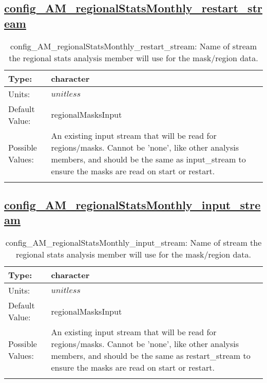 \subsection[config\_AM\_regionalStatsMonthly\_restart\_stream]{\hyperref[sec:nm_tab_AM_regionalStatsMonthly]{config\_AM\_regionalStatsMonthly\_restart\_stream}}
\label{subsec:nm_sec_config_AM_regionalStatsMonthly_restart_stream}
\begin{center}
\begin{longtable}{| p{2.0in} || p{4.0in} |}
    \hline
    Type: & character \\
    \hline
    Units: & $unitless$ \\
    \hline
    Default Value: & regionalMasksInput \\
    \hline
    Possible Values: & An existing input stream that will be read for regions/masks. Cannot be 'none', like other analysis members, and should be the same as input\_stream to ensure the masks are read on start or restart. \\
    \hline
    \caption{config\_AM\_regionalStatsMonthly\_restart\_stream: Name of stream the regional stats analysis member will use for the mask/region data.}
\end{longtable}
\end{center}
\subsection[config\_AM\_regionalStatsMonthly\_input\_stream]{\hyperref[sec:nm_tab_AM_regionalStatsMonthly]{config\_AM\_regionalStatsMonthly\_input\_stream}}
\label{subsec:nm_sec_config_AM_regionalStatsMonthly_input_stream}
\begin{center}
\begin{longtable}{| p{2.0in} || p{4.0in} |}
    \hline
    Type: & character \\
    \hline
    Units: & $unitless$ \\
    \hline
    Default Value: & regionalMasksInput \\
    \hline
    Possible Values: & An existing input stream that will be read for regions/masks. Cannot be 'none', like other analysis members, and should be the same as restart\_stream to ensure the masks are read on start or restart. \\
    \hline
    \caption{config\_AM\_regionalStatsMonthly\_input\_stream: Name of stream the regional stats analysis member will use for the mask/region data.}
\end{longtable}
\end{center}
